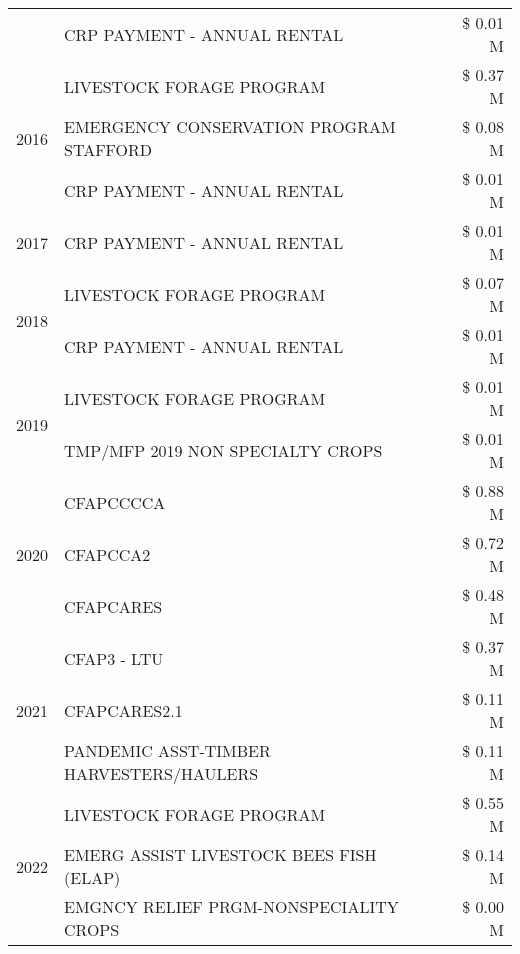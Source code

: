 \begin{tabular}{llr}
 & CRP PAYMENT - ANNUAL RENTAL & \$ 0.01 M \\
\cline{1-3}
\multirow[t]{3}{*}{2016} & LIVESTOCK FORAGE PROGRAM & \$ 0.37 M \\
 & EMERGENCY CONSERVATION PROGRAM STAFFORD & \$ 0.08 M \\
 & CRP PAYMENT - ANNUAL RENTAL & \$ 0.01 M \\
\cline{1-3}
2017 & CRP PAYMENT - ANNUAL RENTAL & \$ 0.01 M \\
\cline{1-3}
\multirow[t]{2}{*}{2018} & LIVESTOCK FORAGE PROGRAM & \$ 0.07 M \\
 & CRP PAYMENT - ANNUAL RENTAL & \$ 0.01 M \\
\cline{1-3}
\multirow[t]{2}{*}{2019} & LIVESTOCK FORAGE PROGRAM & \$ 0.01 M \\
 & TMP/MFP 2019 NON SPECIALTY CROPS & \$ 0.01 M \\
\cline{1-3}
\multirow[t]{3}{*}{2020} & CFAPCCCCA & \$ 0.88 M \\
 & CFAPCCA2 & \$ 0.72 M \\
 & CFAPCARES & \$ 0.48 M \\
\cline{1-3}
\multirow[t]{3}{*}{2021} & CFAP3 - LTU & \$ 0.37 M \\
 & CFAPCARES2.1 & \$ 0.11 M \\
 & PANDEMIC ASST-TIMBER HARVESTERS/HAULERS & \$ 0.11 M \\
\cline{1-3}
\multirow[t]{3}{*}{2022} & LIVESTOCK FORAGE PROGRAM & \$ 0.55 M \\
 & EMERG ASSIST LIVESTOCK BEES FISH (ELAP) & \$ 0.14 M \\
 & EMGNCY RELIEF PRGM-NONSPECIALITY CROPS & \$ 0.00 M \\
\cline{1-3}
\bottomrule
\end{tabular}
